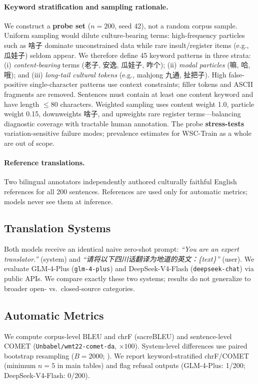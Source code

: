 \documentclass[11pt]{article}
\begin{document}
\paragraph{Keyword stratification and sampling rationale.}
We construct a \textbf{probe set} ($n=200$, seed 42), not a random corpus sample.
Uniform sampling would dilute culture-bearing terms: high-frequency particles such as 啥子 dominate unconstrained data while rare insult/register items (e.g., 瓜娃子) seldom appear.
We therefore define 45 keyword patterns in three strata: (i) \emph{content-bearing} terms (老子, 安逸, 瓜娃子, 咋个); (ii) \emph{modal particles} (嘛, 哈, 哦); and (iii) \emph{long-tail cultural tokens} (e.g., mahjong 九通, 扯把子).
High false-positive single-character patterns use context constraints; filler tokens and ASCII fragments are removed.
Sentences must contain at least one content keyword and have length $\leq 80$ characters.
Weighted sampling uses content weight 1.0, particle weight 0.15, downweights 啥子, and upweights rare register terms---balancing diagnostic coverage with tractable human annotation.
The probe \textbf{stress-tests} variation-sensitive failure modes; prevalence estimates for WSC-Train as a whole are out of scope.

\paragraph{Reference translations.}
Two bilingual annotators independently authored culturally faithful English references for all 200 sentences.
References are used only for automatic metrics; models never see them at inference.

\subsection{Translation Systems}
\label{sec:systems}
Both models receive an identical naive zero-shot prompt:
\textit{``You are an expert translator.''} (system) and
\textit{``请将以下四川话翻译为地道的英文：\{text\}''} (user).
We evaluate GLM-4-Plus (\texttt{glm-4-plus}) and DeepSeek-V4-Flash (\texttt{deepseek-chat}) via public APIs.
We compare exactly these two systems; results do not generalize to broader open- vs.\ closed-source categories.

\subsection{Automatic Metrics}
We compute corpus-level BLEU and chrF (sacreBLEU) and sentence-level COMET (\texttt{Unbabel/wmt22-comet-da}, $\times 100$).
System-level differences use paired bootstrap resampling ($B=2000$; \citealp{koehn-2004-statistical}).
We report keyword-stratified chrF/COMET (minimum $n=5$ in main tables) and flag refusal outputs (GLM-4-Plus: 1/200; DeepSeek-V4-Flash: 0/200).
\end{document}

